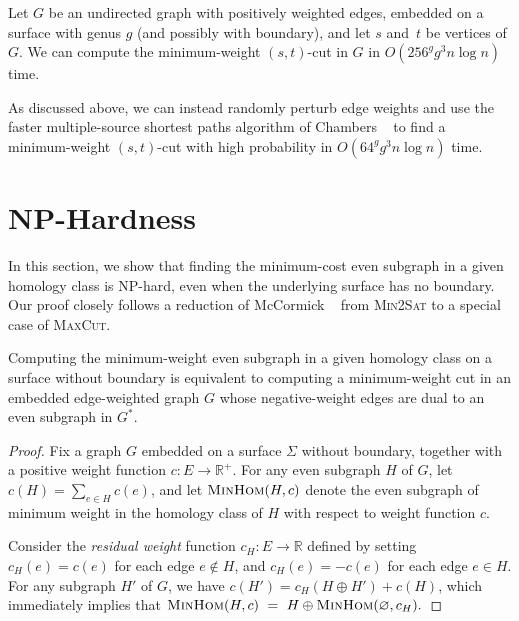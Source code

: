 \documentclass[letterpaper,review]{siamart190516}
\def\Real{\mathbb{R}}
\def\anote#1{\color{purple}Amir: #1 \color{black}}
\def\jnote#1{\textcolor{orange}{Jeff: #1}}
\begin{document}
{%
\begin{corollary}
\label{cor:mincut}
Let $G$ be an undirected graph with positively weighted edges, embedded on a surface with genus $g$ (and possibly with boundary), and let $s$ and~$t$ be vertices of $G$.
We can compute the minimum-weight $(s,t)$-cut in $G$ in $O(256^g g^3 n \log n)$ time.
\end{corollary}

As discussed above, we can instead randomly perturb edge weights and use the faster multiple-source
shortest paths algorithm of Chambers \etal~\cite{cce-msspe-13} to find a minimum-weight $(s,t)$-cut
with high probability in $O(64^g g^3 n \log n)$ time.

\section{{NP}-Hardness}
\label{S:NPhard}

In this section, we show that finding the minimum-cost even subgraph in a given homology class is {NP}-hard, even when the underlying surface has no boundary.  Our proof closely follows a reduction of McCormick \etal~\cite{mrr-edofm-03} from \textsc{Min2Sat} to a special case of \textsc{MaxCut}.

\begin{theorem}
Computing the minimum-weight even subgraph in a given homology class on a surface without boundary is equivalent to computing a minimum-weight cut in an embedded edge-weighted graph $G$ whose negative-weight edges are dual to an even subgraph in $G^*$.
\end{theorem}

\begin{proof}
Fix a graph $G$ embedded on a surface $\Sigma$ without boundary, together with a positive weight function $c\colon E\to \Real^+$.  For any even subgraph $H$ of $G$, let $c(H) = \sum_{e\in H} c(e)$, and let $\textsc{MinHom}(H,c)$ denote the even subgraph of minimum weight in the homology class of $H$ with respect to weight function $c$.

Consider the \emph{residual weight} function $c_H\colon E\to \Real$ defined by setting $c_H(e) = c(e)$ for each edge $e\not\in H$, and $c_H(e) = -c(e)$ for each edge $e\in H$.  For any subgraph $H'$ of $G$, we have $c(H') = c_H(H\oplus H') + c(H)$, which immediately implies that
\(
    \textsc{MinHom}(H,c) ~=~
    H \oplus \textsc{MinHom}(\varnothing, c_H).
\)



\end{proof}}
\end{document}
